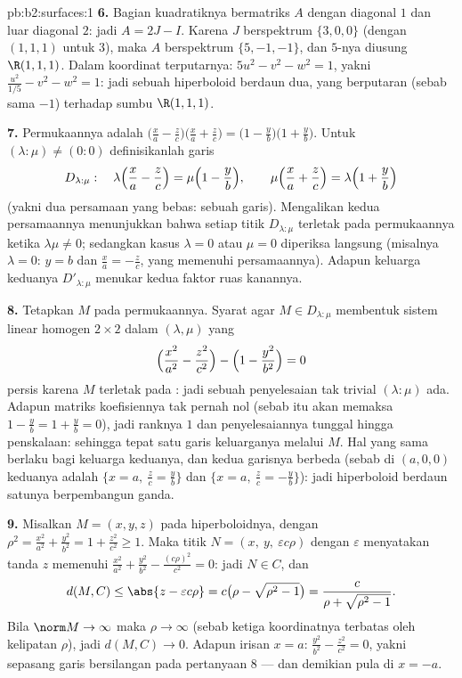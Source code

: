 \begin{solution}{pb:b2:surfaces:1}
\textbf{6.} Bagian kuadratiknya bermatriks $A$ dengan diagonal
$1$ dan luar diagonal $2$: jadi $A = 2J - I$. Karena $J$ berspektrum
$\{3, 0, 0\}$ (dengan  $(1,1,1)$ untuk $3$), maka $A$ berspektrum
$\{5, -1, -1\}$, dan  $5$-nya diusung
$\R(1,1,1)$. Dalam koordinat terputarnya: $5u^2 - v^2 - w^2 =
1$, yakni $\frac{u^2}{1/5} - v^2 - w^2 = 1$: jadi sebuah hiperboloid
berdaun dua, yang berputaran (sebab  sama $-1$) terhadap
sumbu $\R(1,1,1)$.

\textbf{7.} Permukaannya adalah $\bigl(\frac xa - \frac
zc\bigr)\bigl(\frac xa + \frac zc\bigr) = \bigl(1 - \frac
yb\bigr)\bigl(1 + \frac yb\bigr)$. Untuk $(\lambda : \mu) \neq
(0:0)$ definisikanlah garis
\[
D_{\lambda:\mu} :\quad
\lambda\Bigl(\frac xa - \frac zc\Bigr) = \mu\Bigl(1 - \frac
yb\Bigr), \qquad
\mu\Bigl(\frac xa + \frac zc\Bigr) = \lambda\Bigl(1 + \frac
yb\Bigr)
\]
(yakni dua persamaan  yang bebas: sebuah garis). Mengalikan kedua
persamaannya menunjukkan bahwa setiap titik $D_{\lambda:\mu}$ terletak pada
permukaannya ketika $\lambda\mu \neq 0$; sedangkan kasus $\lambda = 0$
atau $\mu = 0$ diperiksa langsung (misalnya $\lambda = 0$: $y =
b$ dan $\frac xa = -\frac zc$, yang memenuhi persamaannya). Adapun
keluarga keduanya $D'_{\lambda:\mu}$ menukar kedua faktor ruas
kanannya.

\textbf{8.} Tetapkan $M$ pada permukaannya. Syarat agar $M \in
D_{\lambda:\mu}$ membentuk sistem linear homogen $2\times2$
dalam $(\lambda, \mu)$ yang 
\[
\Bigl(\frac{x^2}{a^2} - \frac{z^2}{c^2}\Bigr) - \Bigl(1 -
\frac{y^2}{b^2}\Bigr) = 0
\]
persis karena $M$ terletak pada : jadi sebuah penyelesaian
tak trivial $(\lambda : \mu)$ ada. Adapun matriks koefisiennya
tak pernah nol (sebab itu akan memaksa $1 - \frac yb = 1 + \frac yb =
0$), jadi ranknya $1$ dan penyelesaiannya tunggal hingga
penskalaan: sehingga tepat satu garis keluarganya melalui $M$.
Hal yang sama berlaku bagi keluarga keduanya, dan kedua garisnya
berbeda (sebab di $(a, 0, 0)$ keduanya adalah $\{x = a,\ \frac zc = \frac
yb\}$ dan $\{x = a,\ \frac zc = -\frac yb\}$): jadi hiperboloid berdaun
satunya berpembangun ganda.

\textbf{9.} Misalkan $M = (x, y, z)$ pada hiperboloidnya, dengan $\rho^2 =
\frac{x^2}{a^2} + \frac{y^2}{b^2} = 1 + \frac{z^2}{c^2} \geq
1$. Maka titik $N = (x,\ y,\ \varepsilon c\rho)$ dengan
$\varepsilon$ menyatakan tanda $z$ memenuhi $\frac{x^2}{a^2} +
\frac{y^2}{b^2} - \frac{(c\rho)^2}{c^2} = 0$: jadi $N \in C$, dan
\[
d(M, C) \leq \abs{z - \varepsilon c\rho}
= c\bigl(\rho - \sqrt{\rho^2 - 1}\bigr)
= \frac{c}{\rho + \sqrt{\rho^2 - 1}} .
\]
Bila $\norm M \to \infty$ maka $\rho \to \infty$ (sebab ketiga
koordinatnya terbatas oleh kelipatan $\rho$), jadi $d(M, C)
\to 0$. Adapun irisan $x = a$: $\frac{y^2}{b^2} -
\frac{z^2}{c^2} = 0$, yakni sepasang garis bersilangan pada pertanyaan
8 --- dan demikian pula di $x = -a$.


\end{solution}
